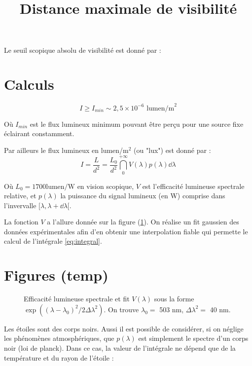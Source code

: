 \documentclass[11pt]{article} %
\title{Distance maximale de visibilité}
\author{}
\date{} %
\begin{document}
\maketitle

Le seuil scopique absolu de visibilité est donné par  :
\section{Calculs}
\begin{equation}
I \geq I_{min} \sim 2,5 \times 10^{-6} \mbox{  lumen/m}^2
\end{equation}

Où $I_{min}$ est le flux lumineux minimum pouvant être perçu pour une source fixe éclairant constamment.

Par ailleurs le flux lumineux en lumen/m$^2$ (ou "lux") est donné par :
\begin{equation}
I = \dfrac{L}{d^2} = \dfrac{L_0}{d^2}  \dint_{0}^{+\infty} V(\lambda) p(\lambda) \dd \lambda
\label{eq:integral}
\end{equation}

Où $L_0 = 1700 \mbox{lumen/W}$ en vision scopique, $V$ est l'efficacité lumineuse spectrale relative, et $p(\lambda)$ la puissance du signal lumineux (en W) comprise dans l'invervalle $[\lambda, \lambda+\dd\lambda[$.

La fonction $V$ a l'allure donnée sur la figure (\ref{fig:efficacite_spectrale}). On réalise un fit gaussien des données expérimentales afin d'en obtenir une interpolation fiable qui permette le calcul de l'intégrale \eqref{eq:integral}.

\section{Figures (temp)}

\begin{figure}[H]
\centering
  \caption{Efficacité lumineuse spectrale et fit $V(\lambda)$ sous la forme $\exp \left ( (\lambda-\lambda_0)^2/2\Delta\lambda^2\right )$. On trouve $\lambda_0 = $ 503 nm, $\Delta \lambda^2 =$ 40 nm.
\label{fig:efficacite_spectrale}}

\end{figure}

Les étoiles sont des corps noirs. Aussi il est possible de considérer, si on néglige les phénomènes atmosphériques, que $p(\lambda)$ est simplement le spectre d'un corps noir (loi de planck). Dans ce cas, la valeur de l'intégrale ne dépend que de la température et du rayon de l'étoile :
\end{document}
